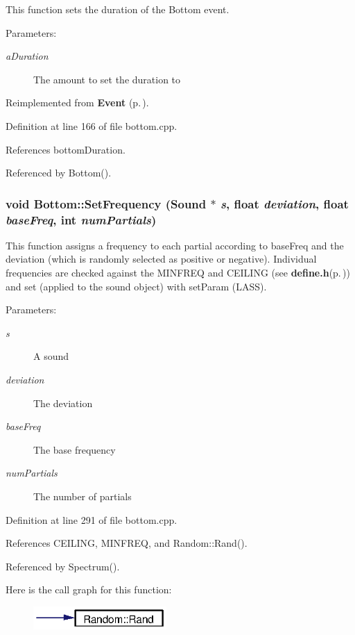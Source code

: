 This function sets the duration of the Bottom event. \begin{Desc}
\item[Parameters:]
\begin{description}
\item[{\em a\-Duration}]The amount to set the duration to \end{description}
\end{Desc}


Reimplemented from {\bf Event} {\rm (p.\,\pageref{classEvent_a8})}.

Definition at line 166 of file bottom.cpp.

References bottom\-Duration.

Referenced by Bottom().
\subsubsection{\setlength{\rightskip}{0pt plus 5cm}void Bottom::Set\-Frequency (Sound $\ast$ {\em s}, float {\em deviation}, float {\em base\-Freq}, int {\em num\-Partials})}\label{classBottom_a18}


This function assigns a frequency to each partial according to base\-Freq and the deviation (which is randomly selected as positive or negative). Individual frequencies are checked against the MINFREQ and CEILING (see {\bf define.h}{\rm (p.\,\pageref{define_8h})}) and set (applied to the sound object) with set\-Param (LASS). \begin{Desc}
\item[Parameters:]
\begin{description}
\item[{\em s}]A sound \item[{\em deviation}]The deviation \item[{\em base\-Freq}]The base frequency \item[{\em num\-Partials}]The number of partials \end{description}
\end{Desc}


Definition at line 291 of file bottom.cpp.

References CEILING, MINFREQ, and Random::Rand().

Referenced by Spectrum().

Here is the call graph for this function:\begin{figure}[H]
\begin{center}
\leavevmode
\includegraphics[width=144pt]{classBottom_a18_cgraph}
\end{center}
\end{figure}
